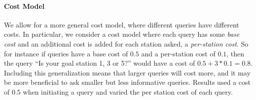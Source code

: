 \documentclass[letterpaper]{article}
\begin{document}
    \paragraph{Cost Model} We allow for a more general cost model, where different queries have different costs. In particular, we consider a cost model where each query has some \emph{base cost} and an additional cost is added for each station asked, a \emph{per-station cost}. So for instance if queries have a base cost of $0.5$ and a per-station cost of $0.1$, then the query ``Is your goal station 1, 3 or 5?'' would have a cost of $0.5 + 3*0.1 = 0.8$. Including this generalization means that larger queries will cost more, and it may be more beneficial to ask smaller but less informative queries.
Results used a cost of $0.5$ when initiating a query and varied the per station cost of each query.
\end{document}
